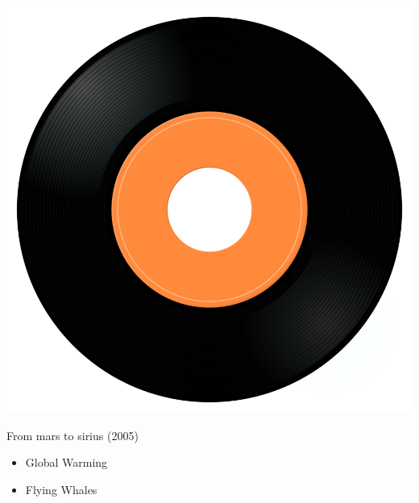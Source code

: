 \begin{minipage}[t]{0.25\textwidth}\vspace{0pt}
\captionsetup{type=figure}
\includegraphics[width=\textwidth]{Images/cover.png}
\caption*{From mars to sirius (2005)}
\end{minipage}
\begin{minipage}[t]{0.25\textwidth}\vspace{0pt}
\begin{itemize}[nosep,leftmargin=1em,labelwidth=*,align=left]
	\setlength{\itemsep}{0pt}
	\item Global Warming
	\item Flying Whales
\end{itemize}
\end{minipage}
